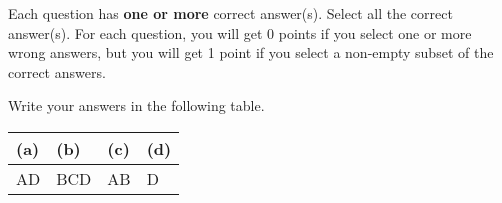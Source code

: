
Each question has \textbf{one or more} correct answer(s). Select all the correct answer(s). For each question, you will get 0 points if you select one or more wrong answers, but you will get 1 point if you select a non-empty subset of the correct answers.

Write your answers in the following table.


\begin{table}[htbp]
    \centering
    \begin{tabular}{|p{2cm}|p{2cm}|p{2cm}|p{2cm}|}
        \hline
        (a) & (b) & (c) & (d) \\
        \hline
        AD  & BCD & AB  & D   \\
        \hline
    \end{tabular}
\end{table}

